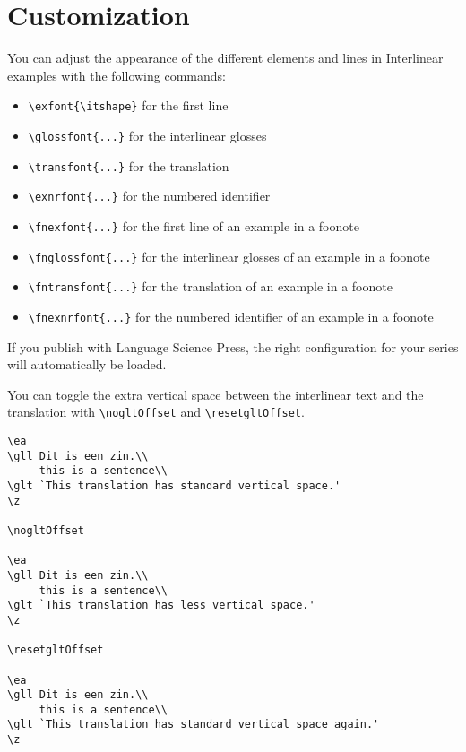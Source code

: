 \documentclass[output=paper]{langscibook}
\newcommand{\cmd}[1]{\texttt{\textbackslash#1}}
\begin{document}
\section{Customization}
You can adjust the appearance of the different elements and lines in Interlinear examples with the following commands:
\begin{itemize}
\item  \cmd{exfont\{\textbackslash itshape\}} for the first line
\item  \cmd{glossfont\{...\}} for the interlinear glosses 
\item  \cmd{transfont\{...\}} for the translation 
\item  \cmd{exnrfont\{...\}} for the numbered identifier
\medskip 
\item  \cmd{fnexfont\{...\}} for the first line of an example in a foonote
\item  \cmd{fnglossfont\{...\}} for the interlinear glosses of an example in a foonote
\item  \cmd{fntransfont\{...\}} for the translation of an example in a foonote
\item  \cmd{fnexnrfont\{...\}} for the numbered identifier of an example in a foonote 
\end{itemize}
    
If you publish with Language Science Press, the right configuration for your series will automatically be loaded.

You can toggle the extra vertical space between the interlinear text and the translation with \cmd{nogltOffset} and \cmd{resetgltOffset}. 
 
\begin{lstlisting}
\ea    
\gll Dit is een zin.\\ 
     this is a sentence\\
\glt `This translation has standard vertical space.'
\z

\nogltOffset

\ea 
\gll Dit is een zin.\\ 
     this is a sentence\\
\glt `This translation has less vertical space.'
\z

\resetgltOffset

\ea 
\gll Dit is een zin.\\ 
     this is a sentence\\
\glt `This translation has standard vertical space again.'
\z
\end{lstlisting}
\end{document}
